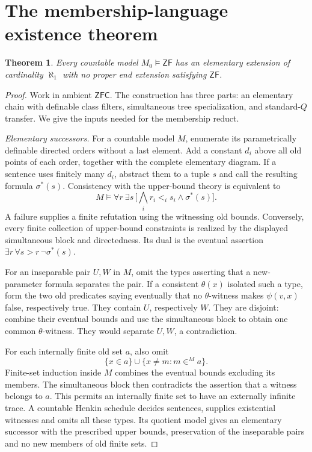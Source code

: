 \documentclass[11pt,a4paper]{amsart}
\newcommand{\ZF}{\ensuremath{\mathsf{ZF}}}
\newcommand{\ZFC}{\ensuremath{\mathsf{ZFC}}}
\newtheorem{theorem}{Theorem}[section]
\begin{document}
\section{The membership-language existence theorem}\label{sec:enayat}
\begin{theorem}\label{thm:end}
Every countable model $M_0\models\ZF$ has an elementary extension of cardinality $\aleph_1$ with no proper end extension satisfying \ZF.
\end{theorem}
\begin{proof}
Work in ambient \ZFC. The construction has three parts: an elementary chain with definable class filters, simultaneous tree specialization, and standard-$Q$ transfer. We give the inputs needed for the membership reduct.

\emph{Elementary successors.} For a countable model $M$, enumerate its parametrically definable directed orders without a last element. Add a constant $d_i$ above all old points of each order, together with the complete elementary diagram. If a sentence uses finitely many $d_i$, abstract them to a tuple $s$ and call the resulting formula $\sigma^*(s)$. Consistency with the upper-bound theory is equivalent to
\[
M\models\forall r\ \exists s\,
\bigl[\bigwedge_i r_i<_i s_i\land\sigma^*(s)\bigr].
\]
A failure supplies a finite refutation using the witnessing old bounds. Conversely, every finite collection of upper-bound constraints is realized by the displayed simultaneous block and directedness. Its dual is the eventual assertion $\exists r\,\forall s>r\,\neg\sigma^*(s)$.

For an inseparable pair $U,W$ in $M$, omit the types asserting that a new-parameter formula separates the pair. If a consistent $\theta(x)$ isolated such a type, form the two old predicates saying eventually that no $\theta$-witness makes $\psi(v,x)$ false, respectively true. They contain $U$, respectively $W$. They are disjoint: combine their eventual bounds and use the simultaneous block to obtain one common $\theta$-witness. They would separate $U,W$, a contradiction.

For each internally finite old set $a$, also omit
\[
\{x\in a\}\cup\{x\ne m:m\in^M a\}.
\]
Finite-set induction inside $M$ combines the eventual bounds excluding its members. The simultaneous block then contradicts the assertion that a witness belongs to $a$. This permits an internally finite set to have an externally infinite trace. A countable Henkin schedule decides sentences, supplies existential witnesses and omits all these types. Its quotient model gives an elementary successor with the prescribed upper bounds, preservation of the inseparable pairs and no new members of old finite sets.


\end{proof}
\end{document}
